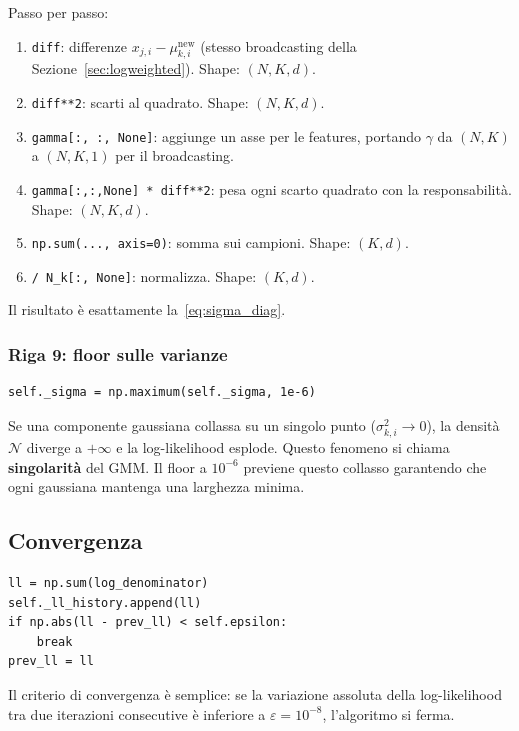 \documentclass[11pt,a4paper]{article}
\begin{document}
Passo per passo:
\begin{enumerate}[nosep]
  \item \texttt{diff}: differenze $x_{j,i} - \mu_{k,i}^{\text{new}}$
        (stesso broadcasting della Sezione~\ref{sec:logweighted}).
        Shape: $(N, K, d)$.
  \item \texttt{diff**2}: scarti al quadrato. Shape: $(N, K, d)$.
  \item \texttt{gamma[:, :, None]}: aggiunge un asse per le features,
        portando $\gamma$ da $(N, K)$ a $(N, K, 1)$ per il broadcasting.
  \item \texttt{gamma[:,:,None] * diff**2}: pesa ogni scarto quadrato
        con la responsabilità. Shape: $(N, K, d)$.
  \item \texttt{np.sum(..., axis=0)}: somma sui campioni. Shape: $(K, d)$.
  \item \texttt{/ N\_k[:, None]}: normalizza. Shape: $(K, d)$.
\end{enumerate}

Il risultato è esattamente la~\eqref{eq:sigma_diag}.

\subsubsection{Riga 9: floor sulle varianze}
\begin{lstlisting}
self._sigma = np.maximum(self._sigma, 1e-6)
\end{lstlisting}

\begin{warnbox}
Se una componente gaussiana collassa su un singolo punto ($\sigma_{k,i}^2
\to 0$), la densità $\mathcal{N}$ diverge a $+\infty$ e la
log-likelihood esplode. Questo fenomeno si chiama \textbf{singolarità}
del GMM. Il floor a $10^{-6}$ previene questo collasso garantendo che
ogni gaussiana mantenga una larghezza minima.
\end{warnbox}

\subsection{Convergenza}

\begin{lstlisting}[caption={Controllo di convergenza}]
ll = np.sum(log_denominator)
self._ll_history.append(ll)
if np.abs(ll - prev_ll) < self.epsilon:
    break
prev_ll = ll
\end{lstlisting}

Il criterio di convergenza è semplice: se la variazione assoluta
della log-likelihood tra due iterazioni consecutive è inferiore a
$\varepsilon = 10^{-8}$, l'algoritmo si ferma.
\end{document}
